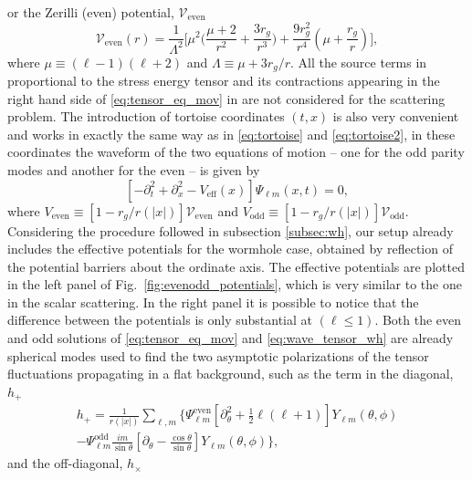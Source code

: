 \documentclass[article,aps,nofootinbib,twocolumn,superscriptaddress]{revtex4-1}
\begin{document}
or the Zerilli (even) potential, $\mathcal{V}_{\mathrm{even}}$ 
\begin{equation}
\mathcal{V}_{\mathrm{even}}(r)=\displaystyle{\frac{1}{\Lambda^2}\bigg[\mu^2\bigg(\frac{\mu+2}{r^2}+\frac{3r_g}{r^3}\bigg)+\frac{9r_g^2}{r^4}\left(\mu+\frac{r_g}{r}\right)\bigg]},
\label{eq:V_even}
\end{equation} 
where $\mu\equiv(\ell-1)(\ell+2)$ and $\Lambda\equiv\mu+3r_g/r$. All the source terms in proportional to the stress energy tensor and its contractions appearing in the right hand side of \eqref{eq:tensor_eq_mov} in \citep{Martel:2005ir} are not considered for the scattering problem. The introduction of tortoise coordinates $(t,x)$ is also very convenient and works in exactly the same way as in \eqref{eq:tortoise} and \eqref{eq:tortoise2}, in these coordinates the waveform of the two equations of motion -- one for the odd parity modes and another for the even -- is given by 
\begin{equation}
\left[-\partial_t^2+\partial_x^2-V_{\mathrm{eff}}(x)\right]\Psi_{\ell m}(x,t) = 0,
\label{eq:wave_tensor_wh}
\end{equation}
where $V_{\mathrm{even}}\equiv[1-r_g/r(|x|)]\mathcal{V}_{\mathrm{even}}$ and $V_{\mathrm{odd}}\equiv[1-r_g/r(|x|)]\mathcal{V}_{\mathrm{odd}}$. Considering the procedure followed in subsection \ref{subsec:wh}, our setup already includes the effective potentials for the wormhole case, obtained by reflection of the potential barriers about the ordinate axis. The effective potentials are plotted in the left panel of Fig.~\ref{fig:evenodd_potentials}, which is very similar to the one in the scalar scattering. In the right panel it is possible to notice that the difference between the potentials is only substantial at $(\ell\leq1)$. Both the even and odd solutions of \eqref{eq:tensor_eq_mov} and \eqref{eq:wave_tensor_wh} are already spherical modes used to find the two asymptotic polarizations of the tensor fluctuations propagating in a flat background, such as the term in the diagonal, $h_+$ 
\begin{align}
\displaystyle{h_+=\frac{1}{r(|x|)}\sum_{\ell,m}\bigg\{\Psi_{\ell m}^{\mathrm{even}}\left[\partial^2_{\theta}+\frac{1}{2}\ell(\ell+1)\right]Y_{\ell m}(\theta,\phi)}\nonumber\\
\displaystyle{-\Psi_{\ell m}^{\mathrm{odd}}\frac{i m}{\sin\theta}\left[\partial_{\theta}-\frac{\cos\theta}{\sin\theta}\right]Y_{\ell m}(\theta,\phi)\bigg\}},
\label{eq:hplus}
\end{align} 
and the off-diagonal, $h_{\times}$ 
\end{document}
